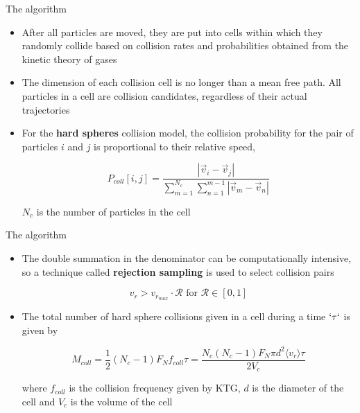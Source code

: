 \documentclass{beamer}
\begin{document}
        \begin{frame}{The algorithm}
            \begin{itemize}
                \setlength\itemsep{0.25cm}
                
                \item<1->After all particles are moved, they are put into cells within which they randomly collide based on collision rates and probabilities obtained from the kinetic theory of gases

                \item<2->The dimension of each collision cell is no longer than a mean free path. All particles in a cell are collision candidates, regardless of their actual trajectories

                \item<3->For the \textbf{hard spheres} collision model, the collision probability for the pair of particles $i$ and $j$ is proportional to their relative speed,
                
                    \begin{equation*}
                        P_{coll}[i, j] = \frac{|\vec{v}_i - \vec{v}_j|}{\sum_{m=1}^{N_c} \sum_{n=1}^{m-1} |\vec{v}_m - \vec{v}_n|}
                    \end{equation*}
                
                $N_c$ is the number of particles in the cell
            \end{itemize}
        \end{frame}

        \begin{frame}{The algorithm}
            \begin{itemize}
                \setlength\itemsep{0.25cm}
                
                \item<1->The double summation in the denominator can be computationally intensive, so a technique called \textbf{rejection sampling} is used to select collision pairs

                    \begin{equation*}
                        v_r > v_{r_{max}} \cdot \mathcal{R} \text{ for } \mathcal{R}\in [0,1]
                    \end{equation*}

                \item<2->The total number of hard sphere collisions given in a cell during a time $` \tau `$ is given by

                    \begin{equation*}
                        M_{coll} = \frac{1}{2} (N_c - 1) F_N f_{coll} \tau = \frac{N_c (N_c - 1) F_N \pi d^2 \langle v_r \rangle \tau}{2 V_c}
                    \end{equation*}

                where $f_{coll}$ is the collision frequency given by KTG, $d$ is the diameter of the cell and $V_c$ is the volume of the cell
            \end{itemize}
        \end{frame}
\end{document}
